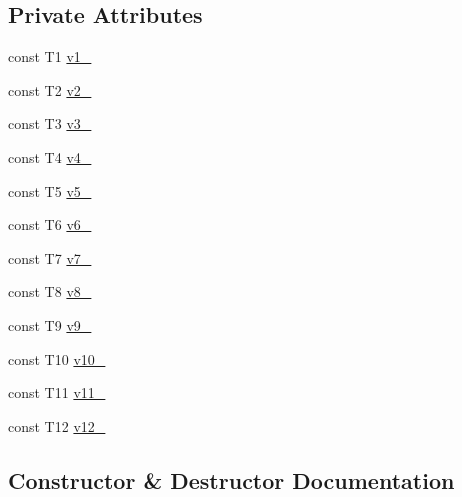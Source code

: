 \subsection*{Private Attributes}
\begin{DoxyCompactItemize}
\item 
const T1 \mbox{\hyperlink{classtesting_1_1internal_1_1_value_array12_a664774d3a667bf1f5aa6ef4ccc74fca9}{v1\+\_\+}}
\item 
const T2 \mbox{\hyperlink{classtesting_1_1internal_1_1_value_array12_ae6a7cf0703b2503eae6e172d9d00e4e9}{v2\+\_\+}}
\item 
const T3 \mbox{\hyperlink{classtesting_1_1internal_1_1_value_array12_ad5fe12ca8ab57900a39e782f2f657734}{v3\+\_\+}}
\item 
const T4 \mbox{\hyperlink{classtesting_1_1internal_1_1_value_array12_a9f06a44d52dfda62646cd0cbb3a51e7d}{v4\+\_\+}}
\item 
const T5 \mbox{\hyperlink{classtesting_1_1internal_1_1_value_array12_a43d5e2aa902b11a00b6b63857e869560}{v5\+\_\+}}
\item 
const T6 \mbox{\hyperlink{classtesting_1_1internal_1_1_value_array12_ab43574f67fd7463f969632b2a9de0852}{v6\+\_\+}}
\item 
const T7 \mbox{\hyperlink{classtesting_1_1internal_1_1_value_array12_a3129df0fd9858ff218467360948aabd1}{v7\+\_\+}}
\item 
const T8 \mbox{\hyperlink{classtesting_1_1internal_1_1_value_array12_adcf225991fb672f4d9c734ea7af7ba44}{v8\+\_\+}}
\item 
const T9 \mbox{\hyperlink{classtesting_1_1internal_1_1_value_array12_a3f16d4ba85a21ade88185f7444d69c08}{v9\+\_\+}}
\item 
const T10 \mbox{\hyperlink{classtesting_1_1internal_1_1_value_array12_aa613601640f903e6194be77bce3e6fe6}{v10\+\_\+}}
\item 
const T11 \mbox{\hyperlink{classtesting_1_1internal_1_1_value_array12_a58b703b324a37c3cb6656902b12f6c40}{v11\+\_\+}}
\item 
const T12 \mbox{\hyperlink{classtesting_1_1internal_1_1_value_array12_a6984f421d476d0d7939a9864208f9e0b}{v12\+\_\+}}
\end{DoxyCompactItemize}


\subsection{Constructor \& Destructor Documentation}
\mbox{\label{classtesting_1_1internal_1_1_value_array12_aaebe12df41b8122fd03f5d6aa1c820a7}} 
